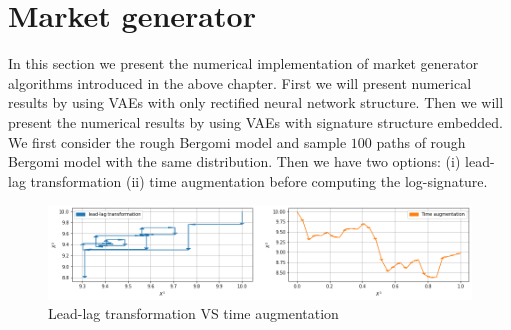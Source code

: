 \documentclass[12pt]{report}
\theoremstyle{definition}
\theoremstyle{remark}
\begin{document}
\section{Market generator}
In this section we present the numerical implementation of market generator algorithms introduced in the above chapter. First we will present numerical results by using VAEs with only rectified neural network structure. Then we will present the numerical results by using VAEs with signature structure embedded. We first consider the rough Bergomi model and sample $100$ paths of rough Bergomi model with the same distribution. Then we have two options: (i) lead-lag transformation (ii) time augmentation before computing the log-signature.
 \begin{figure}[H]
    \centering
    \includegraphics[width=\textwidth]{figs/cvae5.png}
    \caption{Lead-lag transformation VS time augmentation}
\end{figure}
\end{document}

